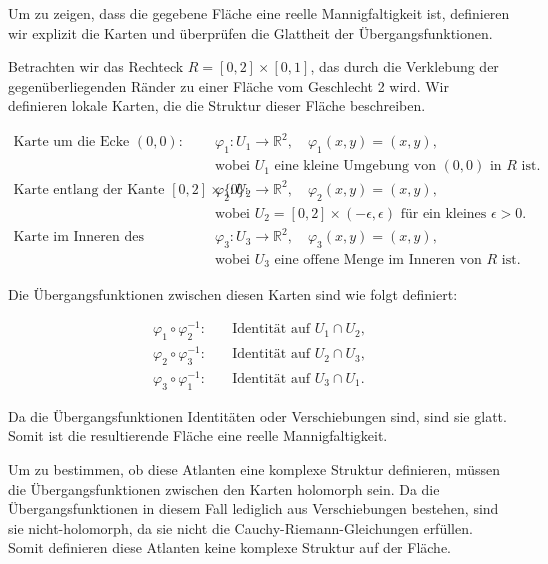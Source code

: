 Um zu zeigen, dass die gegebene Fläche eine reelle Mannigfaltigkeit ist, definieren wir explizit die Karten und überprüfen die Glattheit der Übergangsfunktionen.

Betrachten wir das Rechteck $R = [0, 2] \times [0, 1]$, das durch die Verklebung der gegenüberliegenden Ränder zu einer Fläche vom Geschlecht 2 wird. Wir definieren lokale Karten, die die Struktur dieser Fläche beschreiben.

\begin{align*}
\text{Karte um die Ecke } (0,0): \quad & \varphi_1: U_1 \to \mathbb{R}^2, \quad \varphi_1(x,y) = (x,y), \\
& \text{wobei } U_1 \text{ eine kleine Umgebung von } (0,0) \text{ in } R \text{ ist.} \\
\text{Karte entlang der Kante } [0,2] \times \{0\}: \quad & \varphi_2: U_2 \to \mathbb{R}^2, \quad \varphi_2(x,y) = (x,y), \\
& \text{wobei } U_2 = [0,2] \times (-\epsilon, \epsilon) \text{ für ein kleines } \epsilon > 0. \\
\text{Karte im Inneren des Rechtecks:} \quad & \varphi_3: U_3 \to \mathbb{R}^2, \quad \varphi_3(x,y) = (x,y), \\
& \text{wobei } U_3 \text{ eine offene Menge im Inneren von } R \text{ ist.}
\end{align*}

Die Übergangsfunktionen zwischen diesen Karten sind wie folgt definiert:

\begin{align*}
\varphi_1 \circ \varphi_2^{-1}: \quad & \text{Identität auf } U_1 \cap U_2, \\
\varphi_2 \circ \varphi_3^{-1}: \quad & \text{Identität auf } U_2 \cap U_3, \\
\varphi_3 \circ \varphi_1^{-1}: \quad & \text{Identität auf } U_3 \cap U_1.
\end{align*}

Da die Übergangsfunktionen Identitäten oder Verschiebungen sind, sind sie glatt. Somit ist die resultierende Fläche eine reelle Mannigfaltigkeit.

Um zu bestimmen, ob diese Atlanten eine komplexe Struktur definieren, müssen die Übergangsfunktionen zwischen den Karten holomorph sein. Da die Übergangsfunktionen in diesem Fall lediglich aus Verschiebungen bestehen, sind sie nicht-holomorph, da sie nicht die Cauchy-Riemann-Gleichungen erfüllen. Somit definieren diese Atlanten keine komplexe Struktur auf der Fläche.

